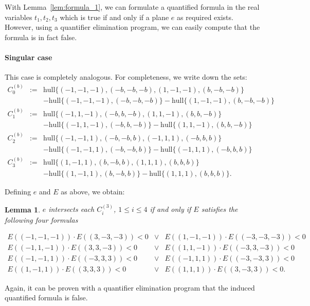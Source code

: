 \documentclass[12pt]{article}
\newtheorem{lemma}[theorem]{Lemma}
\begin{document}
\begin{appendix}
With Lemma~\ref{lem:formula_1}, we can formulate a quantified formula in the real variables 
$t_1,t_2,t_3$ which is true if and only if a plane $e$ as required exists. However, using
a quantifier elimination program, we can easily compute that the formula is in fact false.

\paragraph{Singular case} This case is completely analogous. For completeness, we write down
the sets:
\begin{eqnarray*}
C_0^{(b)}&:=&\mathrm{hull}\{(-1,-1,-1),(-b,-b,-b),(1,-1,-1),(b,-b,-b)\}\\
         &  &-\mathrm{hull}\{(-1,-1,-1),(-b,-b,-b)\}-\mathrm{hull}\{(1,-1,-1),(b,-b,-b)\}\\
C_1^{(b)}&:=&\mathrm{hull}\{(-1,1,-1),(-b,b,-b),(1,1,-1),(b,b,-b)\}\\
         &  &-\mathrm{hull}\{(-1,1,-1),(-b,b,-b)\}-\mathrm{hull}\{(1,1,-1),(b,b,-b)\}\\
C_2^{(b)}&:=&\mathrm{hull}\{(-1,-1,1),(-b,-b,b),(-1,1,1),(-b,b,b)\}\\
         &  &-\mathrm{hull}\{(-1,-1,1),(-b,-b,b)\}-\mathrm{hull}\{(-1,1,1),(-b,b,b)\}\\
C_3^{(b)}&:=&\mathrm{hull}\{(1,-1,1),(b,-b,b),(1,1,1),(b,b,b)\}\\
         &  &-\mathrm{hull}\{(1,-1,1),(b,-b,b)\}-\mathrm{hull}\{(1,1,1),(b,b,b)\}.
\end{eqnarray*}

Defining $e$ and $E$ as above, we obtain:

\begin{lemma}\label{lem:formula_2}
$e$ intersects each $C_i^{(3)}$, $1\leq i\leq 4$ if and only if $E$ satisfies the following four formulas

\begin{eqnarray*}
E((-1,-1,-1))\cdot E((3,-3,-3))< 0&\vee& E((1,-1,-1))\cdot E((-3,-3,-3))< 0\\
E((-1,1,-1))\cdot E((3,3,-3))< 0&\vee& E((1,1,-1))\cdot E((-3,3,-3))< 0\\
E((-1,-1,1))\cdot E((-3,3,3))< 0&\vee& E((-1,1,1))\cdot E((-3,-3,3))< 0\\
E((1,-1,1))\cdot E((3,3,3))< 0&\vee& E((1,1,1))\cdot E((3,-3,3))< 0.
\end{eqnarray*}
\end{lemma}

Again, it can be proven with a quantifier elimination program that the induced quantified formula
is false.


\end{appendix}
\end{document}
